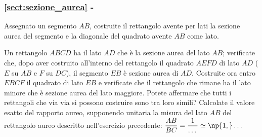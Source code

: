 % 

\begingroup
\hypersetup{linkcolor=black}
\subsubsection*{\ref{sect:sezione_aurea} - 
}
\endgroup

\begin{esercizio}
\label{ese:6.107}
Assegnato un segmento \(AB\), costruite il rettangolo avente per lati 
la sezione aurea del segmento e la diagonale del quadrato avente \(AB\) 
come lato.
\end{esercizio}

\begin{esercizio}
\label{ese:6.108}
Un rettangolo \(ABCD\) ha il lato \(AD\) che è la sezione aurea del lato 
\(AB\); verificate che, dopo aver costruito all'interno del rettangolo 
il quadrato \(AEFD\) di lato \(AD\) (\(E\) su \(AB\) e \(F\) su \(DC\)), il 
segmento \(EB\) è sezione aurea di \(AD\). Costruite ora entro \(EBCF\) il 
quadrato di lato \(EB\) e verificate che il rettangolo che rimane ha il 
lato minore che è sezione aurea del lato maggiore. Potete affermare 
che tutti i rettangoli che via via si possono costruire sono tra loro 
simili? Calcolate il valore esatto del rapporto aureo, supponendo 
unitaria la misura del lato \(AB\) del rettangolo aureo descritto 
nell'esercizio precedente: \(\dfrac{AB}{BC}=\dfrac{1}{\ldots{}}\simeq 
\np{1,}\ldots{}\)
\end{esercizio}

